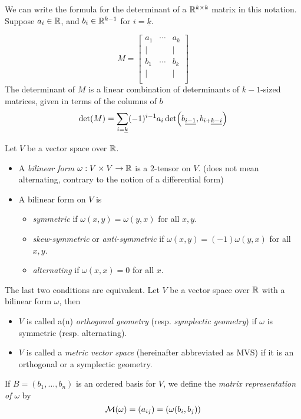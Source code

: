 \documentclass[../main-v2-manifolds.tex]{subfiles}
\begin{document}
\begin{example}\label{rmk:preview of exterior calculus}
We can write the formula for the determinant of a $\mathbb{R}^{k\times k}$ matrix in this notation. Suppose $a_i\in\mathbb{R}$, and $b_i\in\mathbb{R}^{k-1}$ for $i=\underline{k}$.

\[
M = \begin{bmatrix}
    a_1 & \cdots & a_k \\[1ex]
    \vert &  & \vert \\
    b_1 & \cdots & b_k \\
    \vert &  & \vert \\[1ex]
\end{bmatrix}
\]
The determinant of $M$ is a linear combination of determinants of $k-1$-sized matrices, given in terms of the columns of $b$
\[
    \det(M) = \sum_{i=\underline{k}}(-1)^{i-1} a_i\det(\UL{b}[i-1],\UL{b}[i+][k-i])
\]    
\end{example}
    
    Let $V$ be a vector space over $\mathbb{R}$. 
    \begin{itemize}
        \item A \emph{bilinear form} $\omega: V\times V\to \mathbb{R}$ is a $2$-tensor on $V$. (does not mean alternating, contrary to the notion of a differential form)
        \item A bilinear form on $V$ is 
        \begin{itemize}
            \item \emph{symmetric} if $\omega(x,y) = \omega(y,x)$ for all $x,y$.
            \item \emph{skew-symmetric} or \emph{anti-symmetric} if $\omega(x,y) = (-1)\omega(y,x)$ for all $x,y$.
            \item \emph{alternating} if $\omega(x,x)=0$ for all $x$.
        \end{itemize}
    \end{itemize}

    The last two conditions are equivalent. Let $V$ be a vector space over $\mathbb{R}$ with a bilinear form $\omega$, then 
        \begin{itemize}
            \item $V$ is called a(n) \emph{orthogonal geometry} (resp. \emph{symplectic geometry}) if $\omega$ is symmetric (resp. alternating). 
            \item $V$ is called a \emph{metric vector space} (hereinafter abbreviated as MVS) if it is an orthogonal or a symplectic geometry.
        \end{itemize}
    \begin{definition}
        If $B=(b_1,\ldots,b_n)$ is an ordered basis for $V$, we define the \emph{matrix representation of $\omega$} by
        \[
            \mathcal{M}(\omega) = (a_{ij}) = (\omega(b_i, b_j))
        \]
    \end{definition}
    
\end{document}
